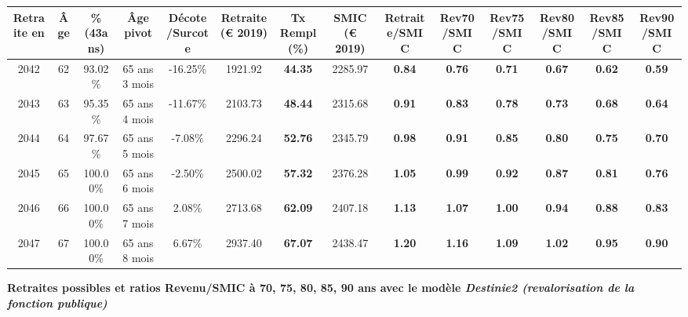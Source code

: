 \begin{adjustbox}{max width=\textwidth} 
\begin{tabular}[htb]{|c|c||c|c|c||c|c||c||c|c|c|c|c|c|} 
\hline 
 Retraite en &  Âge &  \%(43ans) &  Âge pivot &  Décote/Surcote &  Retraite (\euro{} 2019) &  Tx Rempl(\%) &  SMIC (\euro{} 2019) &  Retraite/SMIC &  Rev70/SMIC &  Rev75/SMIC &  Rev80/SMIC &  Rev85/SMIC &  Rev90/SMIC \\ 
\hline \hline 
 2042 &  62 &  93.02\% &  65 ans 3 mois &  -16.25\% &  1921.92 &  {\bf 44.35} &  2285.97 &  {\bf {\color{red} 0.84}} &  {\bf {\color{red} 0.76}} &  {\bf {\color{red} 0.71}} &  {\bf {\color{red} 0.67}} &  {\bf {\color{red} 0.62}} &  {\bf {\color{red} 0.59}} \\ 
\hline 
 2043 &  63 &  95.35\% &  65 ans 4 mois &  -11.67\% &  2103.73 &  {\bf 48.44} &  2315.68 &  {\bf {\color{red} 0.91}} &  {\bf {\color{red} 0.83}} &  {\bf {\color{red} 0.78}} &  {\bf {\color{red} 0.73}} &  {\bf {\color{red} 0.68}} &  {\bf {\color{red} 0.64}} \\ 
\hline 
 2044 &  64 &  97.67\% &  65 ans 5 mois &  -7.08\% &  2296.24 &  {\bf 52.76} &  2345.79 &  {\bf {\color{red} 0.98}} &  {\bf {\color{red} 0.91}} &  {\bf {\color{red} 0.85}} &  {\bf {\color{red} 0.80}} &  {\bf {\color{red} 0.75}} &  {\bf {\color{red} 0.70}} \\ 
\hline 
 2045 &  65 &  100.00\% &  65 ans 6 mois &  -2.50\% &  2500.02 &  {\bf 57.32} &  2376.28 &  {\bf 1.05} &  {\bf {\color{red} 0.99}} &  {\bf {\color{red} 0.92}} &  {\bf {\color{red} 0.87}} &  {\bf {\color{red} 0.81}} &  {\bf {\color{red} 0.76}} \\ 
\hline 
 2046 &  66 &  100.00\% &  65 ans 7 mois &  2.08\% &  2713.68 &  {\bf 62.09} &  2407.18 &  {\bf 1.13} &  {\bf 1.07} &  {\bf 1.00} &  {\bf {\color{red} 0.94}} &  {\bf {\color{red} 0.88}} &  {\bf {\color{red} 0.83}} \\ 
\hline 
 2047 &  67 &  100.00\% &  65 ans 8 mois &  6.67\% &  2937.40 &  {\bf 67.07} &  2438.47 &  {\bf 1.20} &  {\bf 1.16} &  {\bf 1.09} &  {\bf 1.02} &  {\bf {\color{red} 0.95}} &  {\bf {\color{red} 0.90}} \\ 
\hline 
\hline 
\end{tabular} 
\end{adjustbox} 
 
 \vspace{0.1cm} 
{\bf \noindent Retraites possibles et ratios Revenu/SMIC à 70, 75, 80, 85, 90 ans avec le modèle \emph{Destinie2 (revalorisation de la fonction publique)}}  
 
